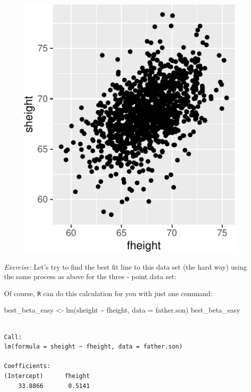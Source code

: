 \documentclass[
  letterpaper,
  DIV=11,
  numbers=noendperiod]{scrreprt}
\newenvironment{Shaded}{\begin{snugshade}}{\end{snugshade}}
\newcommand{\AttributeTok}[1]{\textcolor[rgb]{0.40,0.45,0.13}{#1}}
\newcommand{\FunctionTok}[1]{\textcolor[rgb]{0.28,0.35,0.67}{#1}}
\newcommand{\NormalTok}[1]{\textcolor[rgb]{0.00,0.23,0.31}{#1}}
\newcommand{\OtherTok}[1]{\textcolor[rgb]{0.00,0.23,0.31}{#1}}
\newcommand{\SpecialCharTok}[1]{\textcolor[rgb]{0.37,0.37,0.37}{#1}}
\begin{document}
\begin{figure}[H]

{\centering \includegraphics{./07-linalg_files/figure-pdf/unnamed-chunk-5-1.pdf}

}

\end{figure}

\emph{Exercise:} Let's try to find the best fit line to this data set
(the hard way) using the same process as above for the three - point
data set:

Of course, \texttt{R} can do this calculation for you with just one
command:

\begin{Shaded}
\begin{Highlighting}[]
\NormalTok{best\_beta\_easy }\OtherTok{\textless{}{-}} \FunctionTok{lm}\NormalTok{(sheight }\SpecialCharTok{\textasciitilde{}}\NormalTok{ fheight, }\AttributeTok{data =}\NormalTok{ father.son)}
\NormalTok{best\_beta\_easy}
\end{Highlighting}
\end{Shaded}

\begin{verbatim}

Call:
lm(formula = sheight ~ fheight, data = father.son)

Coefficients:
(Intercept)      fheight  
    33.8866       0.5141  
\end{verbatim}
\end{document}

